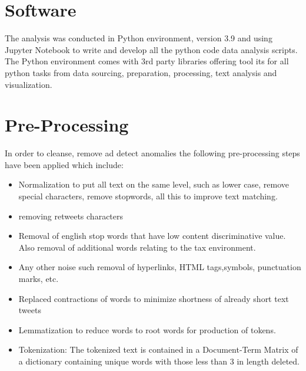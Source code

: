 \section{Software}

The analysis was conducted in Python environment, version 3.9 and using Jupyter Notebook to write and develop all the python code data analysis scripts.  The Python environment comes with 3rd party libraries offering tool its for all python tasks from data sourcing, preparation, processing, text analysis and visualization.   
\section{Pre-Processing}

In order to cleanse, remove ad detect anomalies the following pre-processing steps have been applied which include:
\begin{itemize}
    \item Normalization to put all text on the same level,
    such as lower case, remove special characters, remove stopwords, all this to improve text matching.
\end{itemize}
\begin{itemize}
    \item removing retweets  characters
\end{itemize}
\begin{itemize}
    \item Removal of english stop words that have low content discriminative value.  Also removal of additional words relating to the tax environment. 
\end{itemize}
\begin{itemize}
    \item Any other noise such removal of hyperlinks, HTML tags,symbols, punctuation marks, etc.
\end{itemize}
\begin{itemize}
    \item Replaced contractions of words to minimize shortness of already short text tweets
\end{itemize}
\begin{itemize}
    \item Lemmatization to reduce words to root words for production of tokens.
\end{itemize}
\begin{itemize}
    \item Tokenization: The tokenized text is contained in a Document-Term Matrix of a dictionary containing unique words with those less than 3 in length deleted.
\end{itemize}
